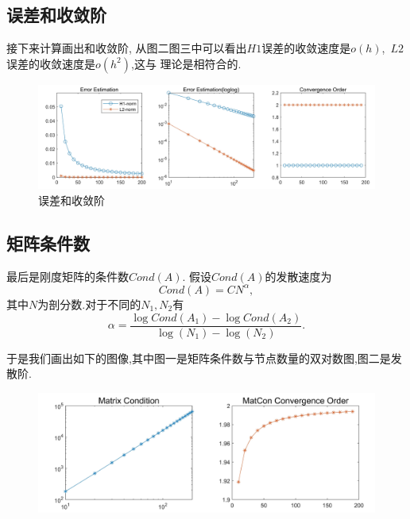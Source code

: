 \documentclass[11pt,reqno]{article}
\numberwithin{equation}{section}
\begin{document}
\subsection{误差和收敛阶}
接下来计算画出和收敛阶, 从图二图三中可以看出$H1$误差的收敛速度是$o(h)$,\ $L2$误差的收敛速度是$o(h^2)$,这与
理论是相符合的.
\begin{figure}[h]
	\centering
	\includegraphics[width=\textwidth]{Error.jpg}
	\caption{误差和收敛阶}
\end{figure}

\newpage

\subsection{矩阵条件数}
最后是刚度矩阵的条件数$Cond(A)$. 假设$Cond(A)$的发散速度为
\begin{equation}
	Cond(A)=CN^\alpha,
\end{equation}
其中$N$为剖分数.对于不同的$N_1,N_2$有
\begin{equation}
	\alpha=\frac{\log{Cond(A_1)}-\log{Cond(A_2)}}{\log(N_1)-\log(N_2)}.
\end{equation}

于是我们画出如下的图像,其中图一是矩阵条件数与节点数量的双对数图,图二是发散阶.
\begin{figure}[h]
	\centering
	\includegraphics[width=\textwidth]{MatCon.jpg}
\end{figure}
\end{document}
